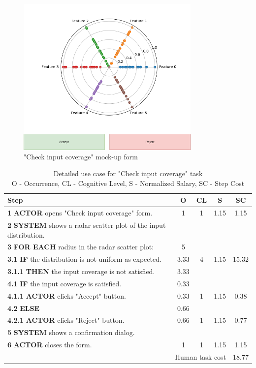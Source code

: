 \begin{figure}[H]
\centering
\includegraphics[width=0.8\textwidth]{figures/check_input_coverage.png}
\caption{"Check input coverage" mock-up form}
\end{figure}

\begin{table}[H]
\centering
\begin{tabularx}{\textwidth}{|X|c|c|c|c|}
\hline
\textbf{Step} & \textbf{O} & \textbf{CL} & \textbf{S} & \textbf{SC} \\
\hline
\textbf{1} \textbf{ACTOR} opens "Check input coverage" form. & 1 & 1 & 1.15 & 1.15 \\
\hline
\textbf{2} \textbf{SYSTEM} shows a radar scatter plot of the input distribution. & & & & \\
\hline
\textbf{3} \textbf{FOR EACH} radius in the radar scatter plot: & 5 & & & \\
\hline
\textbf{3.1} \textbf{IF} the distribution is not uniform as expected. & 3.33 & 4 & 1.15 & 15.32\\
\hline
\textbf{3.1.1} \textbf{THEN} the input coverage is not satisfied. & 3.33 & & & \\
\hline
\textbf{4.1} \textbf{IF} the input coverage is satisfied. & 0.33 & & & \\
\hline
\textbf{4.1.1} \textbf{ACTOR} clicks "Accept" button. & 0.33 & 1 & 1.15 & 0.38\\
\hline
\textbf{4.2} \textbf{ELSE} & 0.66 & & & \\
\hline
\textbf{4.2.1} \textbf{ACTOR} clicks "Reject" button. & 0.66 & 1 & 1.15 & 0.77\\
\hline
\textbf{5} \textbf{SYSTEM} shows a confirmation dialog. & & & & \\
\hline
\textbf{6} \textbf{ACTOR} closes the form. & 1 & 1 & 1.15 & 1.15 \\
\hline
\multicolumn{4}{|r|}{Human task cost} & 18.77\\
\hline
\end{tabularx}
\caption{Detailed use case for "Check input coverage" task\\ 
O - Occurrence, CL - Cognitive Level, S - Normalized Salary, SC - Step Cost}
\label{table:check_input_coverage}
\end{table}

